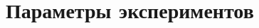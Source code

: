 \chapter{Параметры экспериментов}\label{app:A}
\begin{comment}
	
Выражение \eqref{eq:Young_conjugated} может быть записано как:
%
\begin{multline}
	\begin{bmatrix}
		{\Pi}_1 & 0 \\ 0 & {\Sigma}_2 
	\end{bmatrix}+
	\begin{bmatrix}
		0&-{BK}\\-({BK})\T&0
	\end{bmatrix}+
	\begin{bmatrix}
		{M}_1{F}_1{N}_1{Q}_1 + {Q}_1({M}_1{F}_1{N}_1)\T&0 \\ 0& 0
	\end{bmatrix}
	\\ + \begin{bmatrix}
		0& {Q}_1({S} {M}_1{F}_1{N}_1)\T{P}_2 \\
		{P}_2{M}_1{F}_1{N}_1{Q}_1 - ({BK})\T & 0
	\end{bmatrix}<0,
\end{multline}
%
раскрываем:
%
\begin{multline}
	\label{eq:Young_expand}
	\begin{bmatrix}
		{\Pi}_1 & 0 \\ 0 & {\Sigma}_2 
	\end{bmatrix}+ \begin{bmatrix}
		-{BK} \\ 0
	\end{bmatrix}\begin{bmatrix}
		0 \\ {I}
	\end{bmatrix}\T
	+\begin{bmatrix}
		0 \\ {I} 
	\end{bmatrix}\begin{bmatrix}
		-{BK} \\0
	\end{bmatrix}\T+\begin{bmatrix}
		{Q}_1{N}_1\T \\0
	\end{bmatrix}{F}_1\T\begin{bmatrix}
		{M}_1 \\0
	\end{bmatrix}\T \\ + \begin{bmatrix}

\end{comment}
